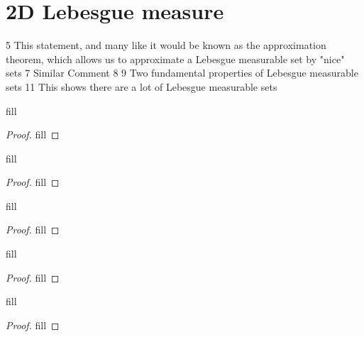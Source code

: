 \section{2D Lebesgue measure}

5 This statement, and many like it would be known as the approximation theorem, which allows us to approximate a Lebesgue measurable set by "nice" sets 
7 Similar Comment
8
9 Two fundamental properties of Lebesgue measurable sets 
11 This shows there are a lot of Lebesgue measurable sets

\begin{exercise}{5}
fill
\end{exercise}
\begin{proof}
fill
\end{proof} 

\begin{exercise}{7}
fill
\end{exercise}
\begin{proof}
fill
\end{proof} 

\begin{exercise}{8}
fill
\end{exercise}
\begin{proof}
fill
\end{proof} 

\begin{exercise}{9}
fill
\end{exercise}
\begin{proof}
fill
\end{proof} 

\begin{exercise}{11}
fill
\end{exercise}
\begin{proof}
fill
\end{proof} 
